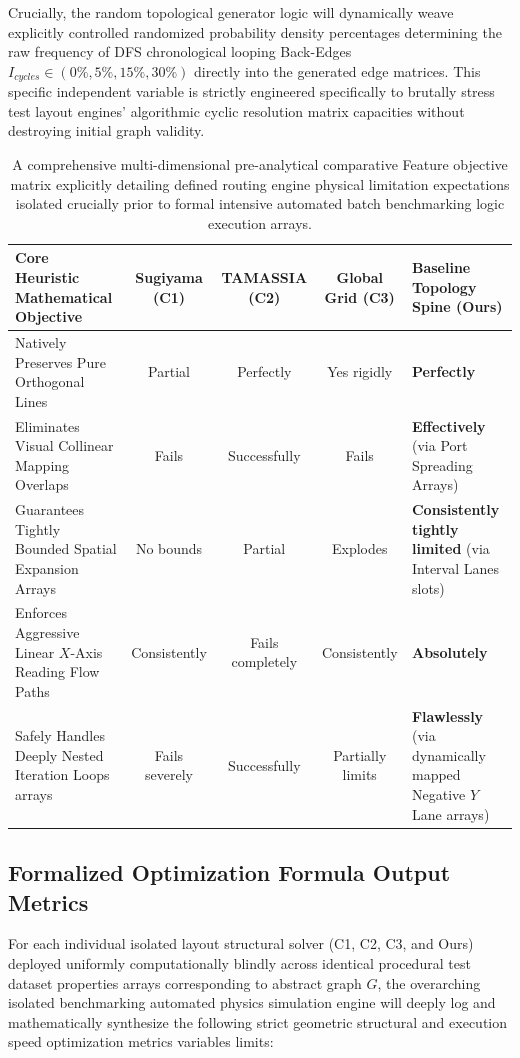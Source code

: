 \documentclass[fleqn,10pt]{wlscirep}
\begin{document}
Crucially, the random topological generator logic will dynamically weave explicitly controlled randomized probability density percentages determining the raw frequency of DFS chronological looping Back-Edges $I_{cycles} \in (0\%, 5\%, 15\%, 30\%)$ directly into the generated edge matrices. This specific independent variable is strictly engineered specifically to brutally stress test layout engines' algorithmic cyclic resolution matrix capacities without destroying initial graph validity.

\begin{table}[ht]
\centering
\begin{tabular}{|p{4.5cm}|c|c|c|p{3.5cm}|}
\hline
\textbf{Core Heuristic Mathematical Objective} & \textbf{Sugiyama (C1)} & \textbf{TAMASSIA (C2)} & \textbf{Global Grid (C3)} & \textbf{Baseline Topology Spine (Ours)} \\
\hline
Natively Preserves Pure Orthogonal Lines & Partial & Perfectly & Yes rigidly & \textbf{Perfectly} \\
Eliminates Visual Collinear Mapping Overlaps & Fails & Successfully & Fails & \textbf{Effectively} (via Port Spreading Arrays) \\
Guarantees Tightly Bounded Spatial Expansion Arrays & No bounds & Partial & Explodes & \textbf{Consistently tightly limited} (via Interval Lanes slots) \\
Enforces Aggressive Linear $X$-Axis Reading Flow Paths & Consistently & Fails completely & Consistently & \textbf{Absolutely} \\
Safely Handles Deeply Nested Iteration Loops arrays & Fails severely & Successfully & Partially limits & \textbf{Flawlessly} (via dynamically mapped Negative $Y$ Lane arrays) \\
\hline
\end{tabular}
\caption{\label{tab:comparative_routing}A comprehensive multi-dimensional pre-analytical comparative Feature objective matrix explicitly detailing defined routing engine physical limitation expectations isolated crucially prior to formal intensive automated batch benchmarking logic execution arrays.}
\end{table}

\subsection*{Formalized Optimization Formula Output Metrics}
For each individual isolated layout structural solver (C1, C2, C3, and Ours) deployed uniformly computationally blindly across identical procedural test dataset properties arrays corresponding to abstract graph $G$, the overarching isolated benchmarking automated physics simulation engine will deeply log and mathematically synthesize the following strict geometric structural and execution speed optimization metrics variables limits:
\end{document}
